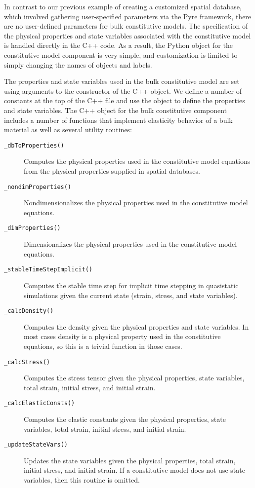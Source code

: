 In contrast to our previous example of creating a customized spatial
database, which involved gathering user-specified parameters via the
Pyre framework, there are no user-defined parameters for bulk
constitutive models. The specification of the physical properties and
state variables associated with the constitutive model is handled
directly in the C++ code. As a result, the Python object for the
constitutive model component is very simple, and customization is
limited to simply changing the names of objects and labels.

The properties and state variables used in the bulk constitutive model
are set using arguments to the constructor of the C++ 
object. We define a number of constants at the top of the C++ file
and use the  object to define the properties and
state variables. The C++ object for the bulk constitutive component
includes a number of functions that implement elasticity behavior
of a bulk material as well as several utility routines:
\begin{description}
\item [{\texttt{\_dbToProperties()}}] Computes the physical properties
  used in the constitutive model equations from the physical properties
  supplied in spatial databases.
\item [{\texttt{\_nondimProperties()}}] Nondimensionalizes the physical
  properties used in the constitutive model equations.
\item [{\texttt{\_dimProperties()}}] Dimensionalizes the physical properties
  used in the constitutive model equations.
\item [{\texttt{\_stableTimeStepImplicit()}}] Computes the stable time
  step for implicit time stepping in quasistatic simulations given
  the current state (strain, stress, and state variables).
\item [{\texttt{\_calcDensity()}}] Computes the density given the physical
  properties and state variables. In most cases density is a physical
  property used in the constitutive equations, so this is a trivial
  function in those cases.
\item [{\texttt{\_calcStress()}}] Computes the stress tensor given the
  physical properties, state variables, total strain, initial stress,
  and initial strain.
\item [{\texttt{\_calcElasticConsts()}}] Computes the elastic constants
  given the physical properties, state variables, total strain, initial
  stress, and initial strain.
\item [{\texttt{\_updateStateVars()}}] Updates the state variables given
  the physical properties, total strain, initial stress, and initial
  strain. If a constitutive model does not use state variables, then
  this routine is omitted.
\end{description}
